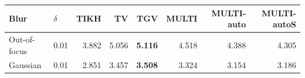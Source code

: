 \begin{tabular}{llrrrrrr}
\toprule
Blur & $\delta$ & TIKH & TV & TGV & MULTI & MULTI-auto & MULTI-autoS \\
\midrule
Out-of-focus & 0.01 & 3.882 & 5.056 & \textbf{5.116} & 4.518 & 4.388 & 4.305 \\
Gaussian & 0.01 & 2.851 & 3.457 & \textbf{3.508} & 3.324 & 3.154 & 3.186 \\
\bottomrule
\end{tabular}